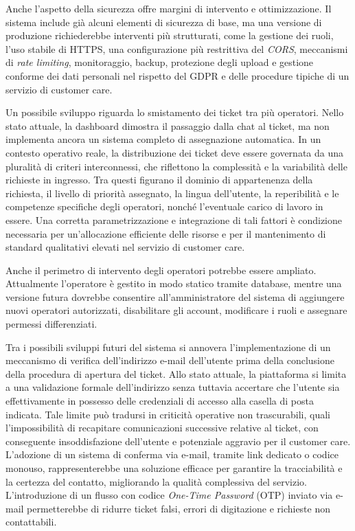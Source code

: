 Anche l'aspetto della sicurezza offre margini di intervento e ottimizzazione. Il sistema include già alcuni elementi di sicurezza di base, ma una versione di produzione richiederebbe interventi più strutturati, come la gestione dei ruoli, l’uso stabile di HTTPS, una configurazione più restrittiva del \textit{CORS}, meccanismi di \textit{rate limiting}, monitoraggio, backup, protezione degli upload e gestione conforme dei dati personali nel rispetto del GDPR e delle procedure tipiche di un servizio di customer care.

Un possibile sviluppo riguarda lo smistamento dei ticket tra più operatori. Nello stato attuale, la dashboard dimostra il passaggio dalla chat al ticket, ma non implementa ancora un sistema completo di assegnazione automatica. In un contesto operativo reale, la distribuzione dei ticket deve essere governata da una pluralità di criteri interconnessi, che riflettono la complessità e la variabilità delle richieste in ingresso. Tra questi figurano il dominio di appartenenza della richiesta, il livello di priorità assegnato, la lingua dell'utente, la reperibilità e le competenze specifiche degli operatori, nonché l'eventuale carico di lavoro in essere. Una corretta parametrizzazione e integrazione di tali fattori è condizione necessaria per un'allocazione efficiente delle risorse e per il mantenimento di standard qualitativi elevati nel servizio di customer care.

Anche il perimetro di intervento degli operatori potrebbe essere ampliato. Attualmente l’operatore è gestito in modo statico tramite database, mentre una versione futura dovrebbe consentire all'amministratore del sistema di aggiungere nuovi operatori autorizzati, disabilitare gli account, modificare i ruoli e assegnare permessi differenziati.

Tra i possibili sviluppi futuri del sistema si annovera l'implementazione di un meccanismo di verifica dell'indirizzo e-mail dell'utente prima della conclusione della procedura di apertura del ticket. Allo stato attuale, la piattaforma si limita a una validazione formale dell'indirizzo senza tuttavia accertare che l'utente sia effettivamente in possesso delle credenziali di accesso alla casella di posta indicata. Tale limite può tradursi in criticità operative non trascurabili, quali l'impossibilità di recapitare comunicazioni successive relative al ticket, con conseguente insoddisfazione dell'utente e potenziale aggravio per il customer care. L'adozione di un sistema di conferma via e-mail, tramite link dedicato o codice monouso, rappresenterebbe una soluzione efficace per garantire la tracciabilità e la certezza del contatto, migliorando la qualità complessiva del servizio. L’introduzione di un flusso con codice \textit{One-Time Password} (OTP) inviato via e-mail permetterebbe di ridurre ticket falsi, errori di digitazione e richieste non contattabili.

